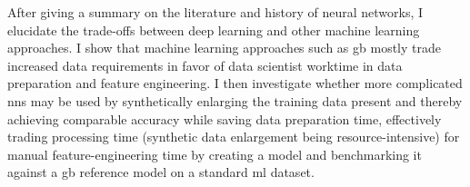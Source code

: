 
After giving a summary on the literature and history of neural networks, I elucidate the trade-offs between deep learning and other machine learning approaches. I show that machine learning approaches such as \ac{gb} mostly trade increased data requirements in favor of data scientist worktime in data preparation and feature engineering.
I then investigate whether more complicated \acp{nn} may be used by synthetically enlarging the training data present and thereby achieving comparable accuracy while saving data preparation time, effectively trading processing time (synthetic data enlargement being resource-intensive) for manual feature-engineering time by creating a model and benchmarking it against a \ac{gb} reference model on a standard \ac{ml} dataset.


